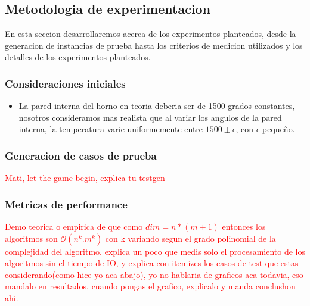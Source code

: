 \subsection{Metodologia de experimentacion}
En esta seccion desarrollaremos acerca de los experimentos planteados, desde la generacion de instancias de prueba hasta los criterios de medicion utilizados y los detalles de los experimentos planteados.
\subsubsection{Consideraciones iniciales}
\begin{itemize}
    \item La pared interna del horno en teoria deberia ser de 1500 grados constantes, nosotros consideramos mas realista que al variar los angulos de la pared interna, la temperatura varie uniformemente entre $1500 \pm \epsilon$, con $\epsilon$ pequeño.
\end{itemize}

\subsubsection{Generacion de casos de prueba}
\textcolor{red}{Mati, let the game begin, explica tu testgen}

\subsubsection{Metricas de performance}
\textcolor{red}{Demo teorica o empirica de que como $dim = n*(m+1)$ entonces los algoritmos son $\mathcal{O}(n^k.m^k)$ con k variando segun el grado polinomial de la complejidad del algoritmo.}
\textcolor{red}{explica un poco que medis solo el procesamiento de los algoritmos sin el tiempo de IO, y explica con itemizes los casos de test que estas considerando(como hice yo aca abajo), yo no hablaria de graficos aca todavia, eso mandalo en resultados, cuando pongas el grafico, explicalo y manda conclushon ahi.}

